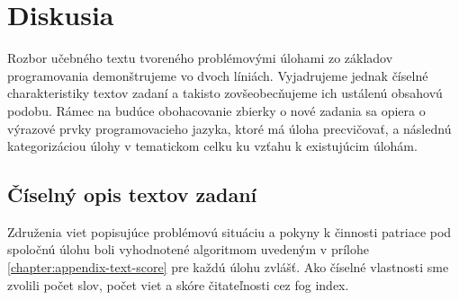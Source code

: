 \section{Diskusia}
Rozbor učebného textu tvoreného problémovými úlohami zo základov programovania demonštrujeme vo dvoch líniách. Vyjadrujeme jednak číselné charakteristiky textov zadaní a takisto zovšeobecňujeme ich ustálenú obsahovú podobu. Rámec na budúce obohacovanie zbierky o nové zadania sa opiera o výrazové prvky programovacieho jazyka, ktoré má úloha precvičovať, a následnú kategorizáciou úlohy v tematickom celku ku vzťahu k existujúcim úlohám.

\subsection{Číselný opis textov zadaní}
Združenia viet popisujúce problémovú situáciu a pokyny k činnosti patriace pod spoločnú úlohu boli vyhodnotené algoritmom uvedeným v prílohe \ref{chapter:appendix-text-score} pre každú úlohu zvlášť. Ako číselné vlastnosti sme zvolili počet slov, počet viet a skóre čitateľnosti cez fog index.


